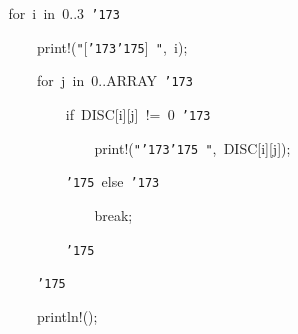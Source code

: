 \documentclass[a4paper,10pt]{article}
\def\mc{\relax}
\begin{document}
\noindent
\mbox{}{\tt\mc \ }{\tt\mc \ }{\tt\mc \ }{\tt\mc \ }{\tt\mc \ }{\tt\mc \ }{\tt\mc \ }{\tt\mc \ }for{\tt\mc \ }i{\tt\mc \ }in{\tt\mc \ }0..3{\tt\mc \ }{\tt\char'173}

\noindent
\mbox{}{\tt\mc \ }{\tt\mc \ }{\tt\mc \ }{\tt\mc \ }{\tt\mc \ }{\tt\mc \ }{\tt\mc \ }{\tt\mc \ }{\tt\mc \ }{\tt\mc \ }{\tt\mc \ }{\tt\mc \ }print!({\tt "}[{\tt\char'173}{\tt\char'175}]{\tt\mc \ }{\tt "},{\tt\mc \ }i);

\noindent
\mbox{}{\tt\mc \ }{\tt\mc \ }{\tt\mc \ }{\tt\mc \ }{\tt\mc \ }{\tt\mc \ }{\tt\mc \ }{\tt\mc \ }{\tt\mc \ }{\tt\mc \ }{\tt\mc \ }{\tt\mc \ }for{\tt\mc \ }j{\tt\mc \ }in{\tt\mc \ }0..ARRAY{\tt\mc \ }{\tt\char'173}

\noindent
\mbox{}{\tt\mc \ }{\tt\mc \ }{\tt\mc \ }{\tt\mc \ }{\tt\mc \ }{\tt\mc \ }{\tt\mc \ }{\tt\mc \ }{\tt\mc \ }{\tt\mc \ }{\tt\mc \ }{\tt\mc \ }{\tt\mc \ }{\tt\mc \ }{\tt\mc \ }{\tt\mc \ }if{\tt\mc \ }DISC[i][j]{\tt\mc \ }!={\tt\mc \ }0{\tt\mc \ }{\tt\char'173}

\noindent
\mbox{}{\tt\mc \ }{\tt\mc \ }{\tt\mc \ }{\tt\mc \ }{\tt\mc \ }{\tt\mc \ }{\tt\mc \ }{\tt\mc \ }{\tt\mc \ }{\tt\mc \ }{\tt\mc \ }{\tt\mc \ }{\tt\mc \ }{\tt\mc \ }{\tt\mc \ }{\tt\mc \ }{\tt\mc \ }{\tt\mc \ }{\tt\mc \ }{\tt\mc \ }print!({\tt "}{\tt\char'173}{\tt\char'175}{\tt\mc \ }{\tt "},{\tt\mc \ }DISC[i][j]);

\noindent
\mbox{}{\tt\mc \ }{\tt\mc \ }{\tt\mc \ }{\tt\mc \ }{\tt\mc \ }{\tt\mc \ }{\tt\mc \ }{\tt\mc \ }{\tt\mc \ }{\tt\mc \ }{\tt\mc \ }{\tt\mc \ }{\tt\mc \ }{\tt\mc \ }{\tt\mc \ }{\tt\mc \ }{\tt\char'175}{\tt\mc \ }else{\tt\mc \ }{\tt\char'173}

\noindent
\mbox{}{\tt\mc \ }{\tt\mc \ }{\tt\mc \ }{\tt\mc \ }{\tt\mc \ }{\tt\mc \ }{\tt\mc \ }{\tt\mc \ }{\tt\mc \ }{\tt\mc \ }{\tt\mc \ }{\tt\mc \ }{\tt\mc \ }{\tt\mc \ }{\tt\mc \ }{\tt\mc \ }{\tt\mc \ }{\tt\mc \ }{\tt\mc \ }{\tt\mc \ }break;

\noindent
\mbox{}{\tt\mc \ }{\tt\mc \ }{\tt\mc \ }{\tt\mc \ }{\tt\mc \ }{\tt\mc \ }{\tt\mc \ }{\tt\mc \ }{\tt\mc \ }{\tt\mc \ }{\tt\mc \ }{\tt\mc \ }{\tt\mc \ }{\tt\mc \ }{\tt\mc \ }{\tt\mc \ }{\tt\char'175}

\noindent
\mbox{}{\tt\mc \ }{\tt\mc \ }{\tt\mc \ }{\tt\mc \ }{\tt\mc \ }{\tt\mc \ }{\tt\mc \ }{\tt\mc \ }{\tt\mc \ }{\tt\mc \ }{\tt\mc \ }{\tt\mc \ }{\tt\char'175}

\noindent
\mbox{}{\tt\mc \ }{\tt\mc \ }{\tt\mc \ }{\tt\mc \ }{\tt\mc \ }{\tt\mc \ }{\tt\mc \ }{\tt\mc \ }{\tt\mc \ }{\tt\mc \ }{\tt\mc \ }{\tt\mc \ }println!();
\end{document}
